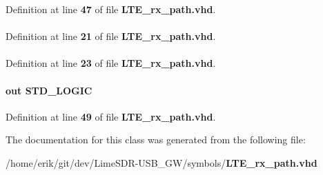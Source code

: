Definition at line {\bf 47} of file {\bf L\+T\+E\+\_\+rx\+\_\+path.\+vhd}.

\paragraph[{std\+\_\+logic\+\_\+1164}]{\hspace{0.3cm}{\ttfamily [Package]}}\label{classLTE__rx__path_acd03516902501cd1c7296a98e22c6fcb}


Definition at line {\bf 21} of file {\bf L\+T\+E\+\_\+rx\+\_\+path.\+vhd}.

\paragraph[{work}]{\hspace{0.3cm}{\ttfamily [Library]}}\label{classLTE__rx__path_a9f49de6f5eed5b4488cba6c9cdd1c215}


Definition at line {\bf 23} of file {\bf L\+T\+E\+\_\+rx\+\_\+path.\+vhd}.

\paragraph[{wrrxfifo\+\_\+wr}]{ {\bfseries \textcolor{keywordflow}{out}\textcolor{vhdlchar}{ }} {\bfseries \textcolor{comment}{S\+T\+D\+\_\+\+L\+O\+G\+IC}\textcolor{vhdlchar}{ }} \hspace{0.3cm}{\ttfamily [Port]}}\label{classLTE__rx__path_a6c76b86cad3e99f2f1c14220d4e1a311}


Definition at line {\bf 49} of file {\bf L\+T\+E\+\_\+rx\+\_\+path.\+vhd}.



The documentation for this class was generated from the following file\+:\begin{DoxyCompactItemize}
\item 
/home/erik/git/dev/\+Lime\+S\+D\+R-\/\+U\+S\+B\+\_\+\+G\+W/symbols/{\bf L\+T\+E\+\_\+rx\+\_\+path.\+vhd}\end{DoxyCompactItemize}
